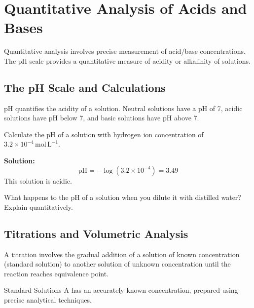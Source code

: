 \FloatBarrier

\section{Quantitative Analysis of Acids and Bases}
\FloatBarrier
\FloatBarrier
\FloatBarrier

Quantitative analysis involves precise measurement of acid/base concentrations. The pH scale provides a quantitative measure of acidity or alkalinity of solutions.

\subsection{The pH Scale and Calculations}
\FloatBarrier
\FloatBarrier
\FloatBarrier
{}

pH quantifies the acidity of a solution. Neutral solutions have a pH of 7, acidic solutions have pH below 7, and basic solutions have pH above 7.

\begin{example}
Calculate the pH of a solution with hydrogen ion concentration \ce{[H+]} of $3.2\times10^{-4}\,\text{mol}\,\text{L}^{-1}$.

\textbf{Solution:}
\[
\text{pH} = -\log(3.2\times10^{-4}) = 3.49
\]
This solution is acidic.
\end{example}

\begin{stopandthink}
What happens to the pH of a solution when you dilute it with distilled water? Explain quantitatively.
\end{stopandthink}

\subsection{Titrations and Volumetric Analysis}
\FloatBarrier
\FloatBarrier
\FloatBarrier

A titration involves the gradual addition of a solution of known concentration (standard solution) to another solution of unknown concentration until the reaction reaches equivalence point.

\begin{keyconcept}{Standard Solutions}
A  has an accurately known concentration, prepared using precise analytical techniques.
\end{keyconcept}

